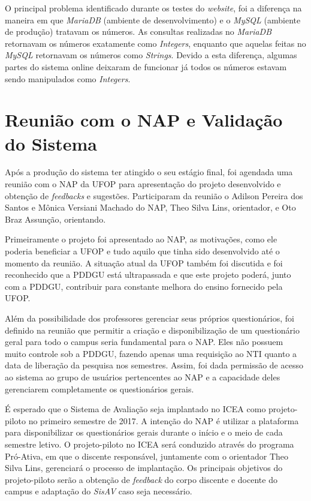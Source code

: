 \documentclass[
  12pt,       %
  openright,      %
  oneside,      %
  a4paper,      %
  english,      %
  french,        %
  spanish,     %
  brazil        %
  ]{abntex2-decsi}
\begin{document}
            O principal problema identificado durante os testes do \textit{website}, foi a diferença na maneira em que \textit{MariaDB} (ambiente de desenvolvimento) e o \textit{MySQL} (ambiente de produção) tratavam os números. As consultas realizadas no \textit{MariaDB} retornavam os números exatamente como \textit{Integers}, enquanto que aquelas feitas no \textit{MySQL} retornavam os números como \textit{Strings}. Devido a esta diferença, algumas partes do sistema online deixaram de funcionar já todos os números estavam sendo manipulados como \textit{Integers}.
                               
	\section{Reunião com o NAP e Validação do Sistema}

	Após a produção do sistema ter atingido o seu estágio final, foi agendada uma reunião com o NAP da UFOP para apresentação do projeto desenvolvido e obtenção de \textit{feedbacks} e sugestões. Participaram da reunião o Adilson Pereira dos Santos e Mônica Versiani Machado do NAP, Theo Silva Lins, orientador, e Oto Braz Assunção, orientando. 
    
    Primeiramente o projeto foi apresentado ao NAP, as motivações, como ele poderia beneficiar a UFOP e tudo aquilo que tinha sido desenvolvido até o momento da reunião. A situação atual da UFOP também foi discutida e foi reconhecido que a PDDGU está ultrapassada e que este projeto poderá, junto com a PDDGU, contribuir para constante melhora do ensino fornecido pela UFOP.
    
    Além da possibilidade dos professores gerenciar seus próprios questionários, foi definido na reunião que permitir a criação e disponibilização de um questionário geral para todo o campus seria fundamental para o NAP. Eles não possuem muito controle sob a PDDGU, fazendo apenas uma requisição ao NTI quanto a data de liberação da pesquisa nos semestres. Assim, foi dada permissão de acesso ao sistema ao grupo de usuários pertencentes ao NAP e a capacidade deles gerenciarem completamente os questionários gerais. 
    
    É esperado que o Sistema de Avaliação seja implantado no ICEA como projeto-piloto no primeiro semestre de 2017. A intenção do NAP é utilizar a plataforma para disponibilizar os questionários gerais durante o início e o meio de cada semestre letivo. O projeto-piloto no ICEA será conduzido através do programa Pró-Ativa, em que o discente responsável, juntamente com o orientador Theo Silva Lins, gerenciará o processo de implantação. Os principais objetivos do projeto-piloto serão a obtenção de \textit{feedback} do corpo discente e docente do campus e adaptação do \textit{SisAV} caso seja necessário. 
    
\end{document}
